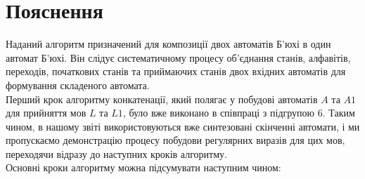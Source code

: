 \documentclass[12pt,a4paper]{article}
\begin{document}
\section*{Пояснення}

Наданий алгоритм призначений для композиції двох автоматів Б'юхі в один автомат Б'юхі. Він слідує систематичному процесу об'єднання станів, алфавітів, переходів, початкових станів та приймаючих станів двох вхідних автоматів для формування складеного автомата.  \\

\setlength{\parindent}{0pt}Перший крок алгоритму конкатенації, який полягає у побудові автоматів \(A\) та \(A1\) для прийняття мов \(L\) та \(L1\), було вже виконано в співпраці з підгрупою 6. Таким чином, в нашому звіті використовуються вже синтезовані скінченні автомати, і ми пропускаємо демонстрацію процесу побудови регулярних виразів для цих мов, переходячи відразу до наступних кроків алгоритму. \\

\setlength{\parindent}{0pt}Основні кроки алгоритму можна підсумувати наступним чином:
\end{document}
